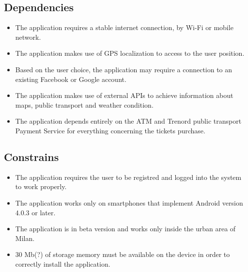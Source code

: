 \subsection{Dependencies}
\begin{itemize}
	\item The application requires a stable internet connection, by Wi-Fi or mobile network.
	\item The application makes use of GPS localization to access to the user position.
	\item Based on the user choice, the application may require a connection to an existing Facebook or Google account.
	\item The application makes use of external APIs to achieve information about maps, public transport and weather condition.
	\item The application depends entirely on the ATM and Trenord public transport Payment Service for everything concerning the tickets purchase.
\end{itemize}
\subsection{Constrains}
\begin{itemize}
	\item The application requires the user to be registred and logged into the system to work properly.
	\item The application works only on smartphones that implement Android version 4.0.3 or later.
	\item The application is in beta version and works only inside the urban area of Milan.
	\item 30 Mb(?) of storage memory must be available on the device in order to correctly install the application.
\end{itemize}


